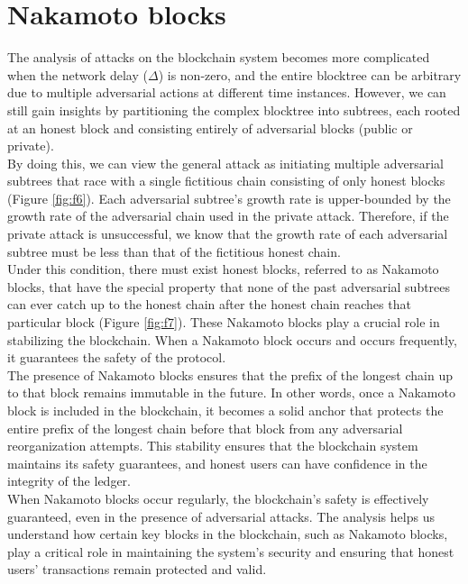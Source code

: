 \documentclass{report}
\begin{document}
\section{Nakamoto blocks}
The analysis of attacks on the blockchain system becomes more complicated when the network delay ($\Delta$) is non-zero, and the entire blocktree can be arbitrary due to multiple adversarial actions at different time instances. However, we can still gain insights by partitioning the complex blocktree into subtrees, each rooted at an honest block and consisting entirely of adversarial blocks (public or private).\\
By doing this, we can view the general attack as initiating multiple adversarial subtrees that race with a single fictitious chain consisting of only honest blocks (Figure \ref{fig:f6}). Each adversarial subtree's growth rate is upper-bounded by the growth rate of the adversarial chain used in the private attack. Therefore, if the private attack is unsuccessful, we know that the growth rate of each adversarial subtree must be less than that of the fictitious honest chain.\\
Under this condition, there must exist honest blocks, referred to as Nakamoto blocks, that have the special property that none of the past adversarial subtrees can ever catch up to the honest chain after the honest chain reaches that particular block (Figure \ref{fig:f7}). These Nakamoto blocks play a crucial role in stabilizing the blockchain. When a Nakamoto block occurs and occurs frequently, it guarantees the safety of the protocol.\\
The presence of Nakamoto blocks ensures that the prefix of the longest chain up to that block remains immutable in the future. In other words, once a Nakamoto block is included in the blockchain, it becomes a solid anchor that protects the entire prefix of the longest chain before that block from any adversarial reorganization attempts. This stability ensures that the blockchain system maintains its safety guarantees, and honest users can have confidence in the integrity of the ledger.\\
When Nakamoto blocks occur regularly, the blockchain's safety is effectively guaranteed, even in the presence of adversarial attacks. The analysis helps us understand how certain key blocks in the blockchain, such as Nakamoto blocks, play a critical role in maintaining the system's security and ensuring that honest users' transactions remain protected and valid.
\end{document}

